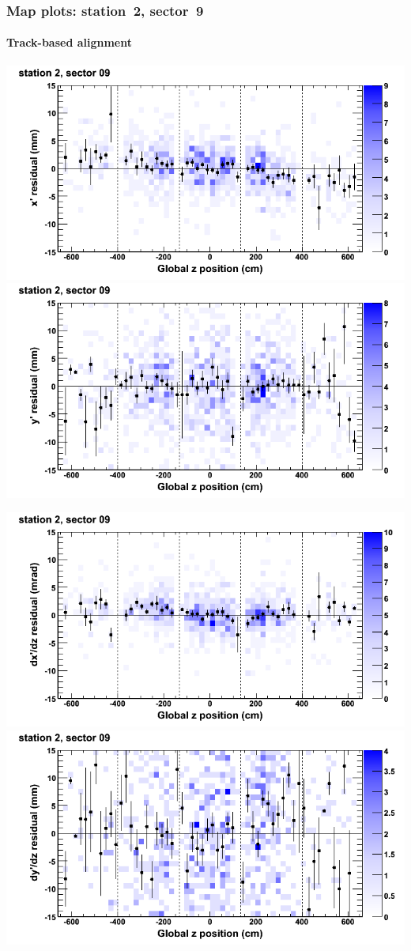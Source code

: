 \documentclass[compress]{beamer}
\begin{document}
\begin{frame}
\frametitle{Map plots: station~2, sector~9}
\framesubtitle{Track-based alignment}
\includegraphics[width=0.5\linewidth]{mapplots_re05/DTvsz_st2sec09_x.png}
\includegraphics[width=0.5\linewidth]{mapplots_re05/DTvsz_st2sec09_y.png}

\includegraphics[width=0.5\linewidth]{mapplots_re05/DTvsz_st2sec09_dxdz.png}
\includegraphics[width=0.5\linewidth]{mapplots_re05/DTvsz_st2sec09_dydz.png}
\end{frame}
\end{document}
